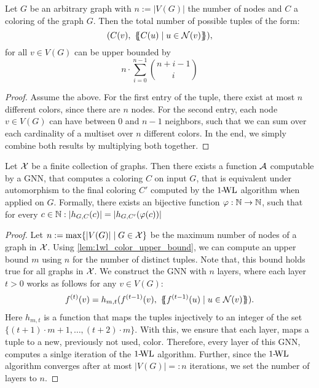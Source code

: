 \begin{lemma}\label{lem:1wl_color_upper_bound}
    Let $G$ be an arbitrary graph with $n := |V(G)|$ the number of nodes and $C$ a coloring of the graph $G$. Then the total number of possible tuples of the form:
    \begin{equation*}
        (C(v), \ \{\!\!\{ C(u) \mid u \in \mathcal{N}(v) \}\!\!\}),
    \end{equation*}
    for all $v \in V(G)$ can be upper bounded by
    \begin{equation*}
        n \cdot \sum_{i=0}^{n-1} \binom{n+i -1}{i}
    \end{equation*}
\end{lemma}
\begin{proof}
    Assume the above. For the first entry of the tuple, there exist at most $n$ different colors, since there are $n$ nodes. For the second entry, each node $v \in V(G)$ can have between $0$ and $n-1$ neighbors, such that we can sum over each cardinality of a multiset over $n$ different colors. In the end, we simply combine both results by multiplying both together.
\end{proof}

\begin{lemma}
    Let $\mathcal{X}$ be a finite collection of graphs. Then there exists a function $\mathcal{A}$ computable by a GNN, that computes a coloring $C$ on input $G$, that is equivalent under automorphism to the final coloring $C'$ computed by the $\text{1-\!WL}$ algorithm when applied on $G$. Formally, there exists an bijective function $\varphi: \mathbb{N} \rightarrow \mathbb{N}$, such that for every $c \in \mathbb{N}: |h_{G, C}(c)| = |h_{G, C'}(\varphi(c))|$
\end{lemma}

\begin{proof}
Let $n := \max \{ |V(G)| \mid G \in \mathcal{X} \}$ be the maximum number of nodes of a graph in $\mathcal{X}$. Using \cref{lem:1wl_color_upper_bound}, we can compute an upper bound $m$ using $n$ for the number of distinct tuples. Note that, this bound holds true for all graphs in $\mathcal{X}$. We construct the GNN with $n$ layers, where each layer $t > 0$ works as follows for any $v \in V(G)$:
\begin{align*}
    f^{(t)}(v) = h_{m,t}(f^{(t-1)}(v), \ \{\!\!\{ f^{(t-1)}(u) \mid u \in \mathcal{N}(v) \}\!\!\}).
\end{align*}
Here $h_{m,t}$ is a function that maps the tuples injectively to an integer of the set $\{ (t+1)\cdot m +1, \ldots, (t+2)\cdot m \}$. With this, we ensure that each layer, maps a tuple to a new, previously not used, color. Therefore, every layer of this GNN, computes a sinlge iteration of the $\text{1-\!WL}$ algorithm. Further, since the $\text{1-\!WL}$ algorithm converges after at most $|V(G)| =: n$ iterations, we set the number of layers to $n$.
\end{proof}

